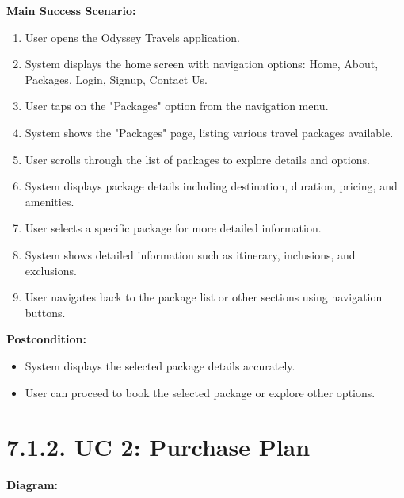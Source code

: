 \documentclass{scrreprt}
\begin{document}
\textbf{Main Success Scenario:}
\begin{enumerate}
    \item User opens the Odyssey Travels application.
    \item System displays the home screen with navigation options: Home, About, Packages, Login, Signup, Contact Us.
    \item User taps on the "Packages" option from the navigation menu.
    \item System shows the "Packages" page, listing various travel packages available.
    \item User scrolls through the list of packages to explore details and options.
    \item System displays package details including destination, duration, pricing, and amenities.
    \item User selects a specific package for more detailed information.
    \item System shows detailed information such as itinerary, inclusions, and exclusions.
    \item User navigates back to the package list or other sections using navigation buttons.
\end{enumerate}

\textbf{Postcondition:}
\begin{itemize}
    \item System displays the selected package details accurately.
    \item User can proceed to book the selected package or explore other options.
\end{itemize}

\section*{\textbf{7.1.2. UC 2: Purchase Plan}}
\textbf{Diagram:}
\newline
\newline
\begin{center}
    \parbox{0.8\textwidth}{ 
        \centering
    }
\end{center}
\end{document}
